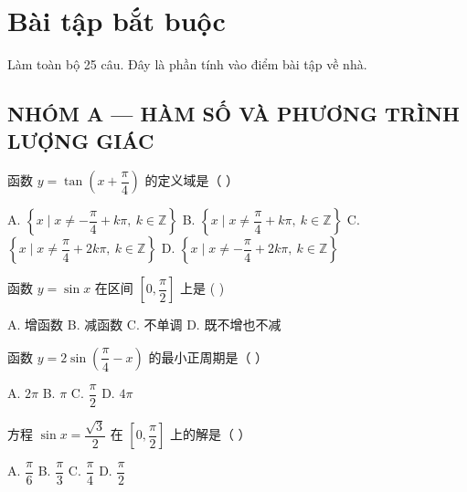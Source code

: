 \documentclass[11pt, a4paper]{article}
\begin{document}

\section{Bài tập bắt buộc}

Làm toàn bộ 25 câu. Đây là phần tính vào điểm bài tập về nhà.

\subsection*{NHÓM A — HÀM SỐ VÀ PHƯƠNG TRÌNH LƯỢNG GIÁC}

\begin{baitap}[1]
函数 $y = \tan\!\left(x + \dfrac{\pi}{4}\right)$ 的定义域是（ ）
\par\vspace{3pt}
\noindent A. $\left\{x \mid x \ne -\dfrac{\pi}{4} + k\pi,\ k \in \mathbb{Z}\right\}$ \quad B. $\left\{x \mid x \ne \dfrac{\pi}{4} + k\pi,\ k \in \mathbb{Z}\right\}$ \quad C. $\left\{x \mid x \ne \dfrac{\pi}{4} + 2k\pi,\ k \in \mathbb{Z}\right\}$ \quad D. $\left\{x \mid x \ne -\dfrac{\pi}{4} + 2k\pi,\ k \in \mathbb{Z}\right\}$
\end{baitap}

\begin{baitap}[2]
函数 $y = \sin x$ 在区间 $\left[0, \dfrac{\pi}{2}\right]$ 上是 ( )
\par\vspace{3pt}
\noindent A. 增函数 \quad B. 减函数 \quad C. 不单调 \quad D. 既不增也不减
\end{baitap}

\begin{baitap}[3]
函数 $y = 2\sin\!\left(\dfrac{\pi}{4} - x\right)$ 的最小正周期是（ ）
\par\vspace{3pt}
\noindent A. $2\pi$ \quad B. $\pi$ \quad C. $\dfrac{\pi}{2}$ \quad D. $4\pi$
\end{baitap}

\begin{baitap}[4]
方程 $\sin x = \dfrac{\sqrt{3}}{2}$ 在 $\left[0, \dfrac{\pi}{2}\right]$ 上的解是（ ）
\par\vspace{3pt}
\noindent A. $\dfrac{\pi}{6}$ \quad B. $\dfrac{\pi}{3}$ \quad C. $\dfrac{\pi}{4}$ \quad D. $\dfrac{\pi}{2}$
\end{baitap}
\end{document}
